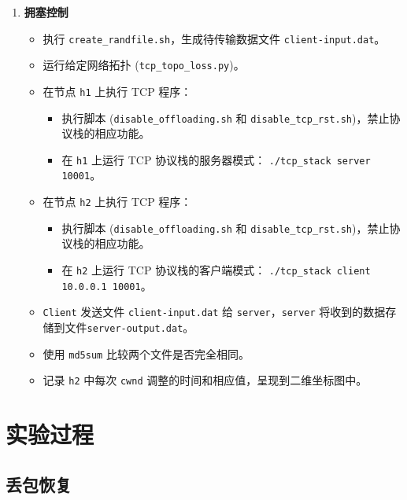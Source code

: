 \documentclass[UTF8]{report}
\begin{document}
\begin{enumerate}
    \item \textbf{拥塞控制}
    \begin{itemize}
        \item 执行 \texttt{create\_randfile.sh}，生成待传输数据文件 \texttt{client-input.dat}。
        \item 运行给定网络拓扑 (\texttt{tcp\_topo\_loss.py})。
        \item 在节点 \texttt{h1} 上执行 TCP 程序：
        \begin{itemize}
            \item 执行脚本 (\texttt{disable\_offloading.sh} 和 \texttt{disable\_tcp\_rst.sh})，禁止协议栈的相应功能。
            \item 在 \texttt{h1} 上运行 TCP 协议栈的服务器模式：
            \texttt{./tcp\_stack server 10001}。
        \end{itemize}
        \item 在节点 \texttt{h2} 上执行 TCP 程序：
        \begin{itemize}
            \item 执行脚本 (\texttt{disable\_offloading.sh} 和 \texttt{disable\_tcp\_rst.sh})，禁止协议栈的相应功能。
            \item 在 \texttt{h2} 上运行 TCP 协议栈的客户端模式：
            \texttt{./tcp\_stack client 10.0.0.1 10001}。
        \end{itemize}
        \item \texttt{Client} 发送文件 \texttt{client-input.dat} 给 \texttt{server}，\texttt{server} 将收到的数据存储到文件\texttt{server-output.dat}。
        \item 使用 \texttt{md5sum} 比较两个文件是否完全相同。
        \item 记录 \texttt{h2} 中每次 \texttt{cwnd} 调整的时间和相应值，呈现到二维坐标图中。
    \end{itemize}

\end{enumerate}

\section{实验过程}

\subsection{丢包恢复}
\end{document}

